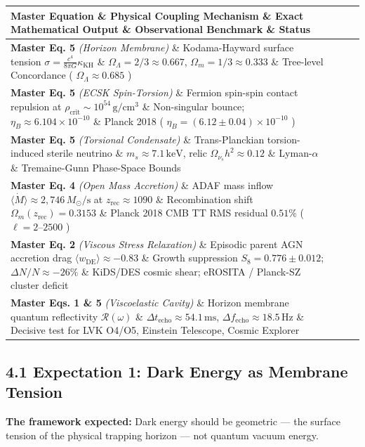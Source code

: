 \documentclass[11pt,a4paper]{article}
\theoremstyle{definition}\newtheorem{definition}{Definition}
\theoremstyle{remark}\newtheorem{remark}{Remark}
\begin{document}
\begin{longtable}{llll}
\hline
Master Equation \& Physical Coupling Mechanism \& Exact Mathematical Output \& Observational Benchmark \& Status \\
\hline
\textbf{Master Eq. 5} \textit{(Horizon Membrane)} \& Kodama-Hayward surface tension $\sigma = \frac{c^4}{8\pi G}\kappa_{\text{KH}}$ \& $\Omega_\Lambda = 2/3 \approx 0.667$, $\Omega_m = 1/3 \approx 0.333$ \& Tree-level Concordance ( $\Omega_\Lambda \approx 0.685$ ) \\
\textbf{Master Eq. 5} \textit{(ECSK Spin-Torsion)} \& Fermion spin-spin contact repulsion at $\rho_{\text{crit}} \sim 10^{54}\,\mathrm{g/cm^3}$ \& Non-singular bounce; $\eta_B \approx 6.104 \times 10^{-10}$ \& Planck 2018 ( $\eta_B = (6.12 \pm 0.04) \times 10^{-10}$ ) \\
\textbf{Master Eq. 5} \textit{(Torsional Condensate)} \& Trans-Planckian torsion-induced sterile neutrino \& $m_s \approx 7.1\,\text{keV}$, relic $\Omega_{\nu_s}h^2 \approx 0.12$ \& Lyman-$\alpha$ \& Tremaine-Gunn Phase-Space Bounds \\
\textbf{Master Eq. 4} \textit{(Open Mass Accretion)} \& ADAF mass inflow $\langle \dot{M} \rangle \approx 2{,}746\,M_\odot/\text{s}$ at $z_{\text{rec}} \approx 1090$ \& Recombination shift $\Omega_m(z_{\text{rec}}) = 0.3153$ \& Planck 2018 CMB TT RMS residual \textbf{$0.51\%$} ( $\ell = 2\text{--}2500$ ) \\
\textbf{Master Eq. 2} \textit{(Viscous Stress Relaxation)} \& Episodic parent AGN accretion drag $\langle w_{\text{DE}} \rangle \approx -0.83$ \& Growth suppression $S_8 = 0.776 \pm 0.012$; $\Delta N/N \approx -26\%$ \& KiDS/DES cosmic shear; eROSITA / Planck-SZ cluster deficit \\
\textbf{Master Eqs. 1 \& 5} \textit{(Viscoelastic Cavity)} \& Horizon membrane quantum reflectivity $\mathcal{R}(\omega)$ \& $\Delta t_{\text{echo}} \approx 54.1\,\text{ms}$, $\Delta f_{\text{echo}} \approx 18.5\,\text{Hz}$ \& Decisive test for LVK O4/O5, Einstein Telescope, Cosmic Explorer \\
\hline
\end{longtable}\subsection{4.1 Expectation 1: Dark Energy as Membrane Tension}

\textbf{The framework expected:} Dark energy should be geometric — the surface tension of the physical trapping horizon — not quantum vacuum energy.
\end{document}
